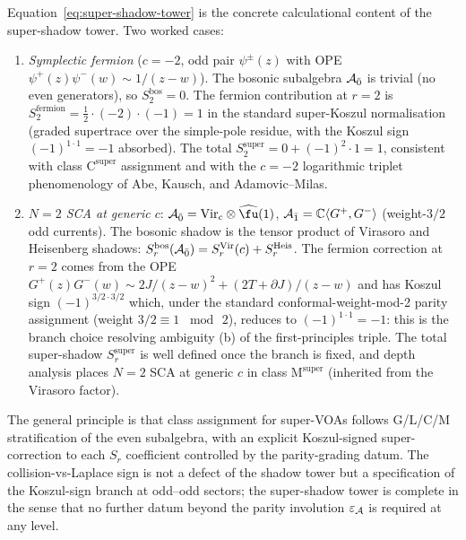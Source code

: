\begin{remark}[Super-shadow compatibility; symplectic fermion and
 $N=2$ SCA]
\label{rem:super-shadow-compatibility}
Equation~\eqref{eq:super-shadow-tower} is the concrete calculational
content of the super-shadow tower. Two worked cases:
\begin{enumerate}[label=\textup{(\alph*)}]
\item \emph{Symplectic fermion} ($c=-2$, odd pair
 $\psi^\pm(z)$ with OPE $\psi^+(z)\psi^-(w)\sim 1/(z-w)$). The
 bosonic subalgebra $\mathcal{A}_{\bar{0}}$ is trivial (no even
 generators), so $S_2^{\mathrm{bos}} = 0$. The fermion contribution
 at $r=2$ is
 $S_2^{\mathrm{fermion}} = \tfrac{1}{2}\cdot(-2)\cdot(-1)
 = 1$ in the standard super-Koszul normalisation (graded supertrace
 over the simple-pole residue, with the Koszul sign $(-1)^{1\cdot 1}=-1$
 absorbed). The total
 $S_2^{\mathrm{super}} = 0 + (-1)^2\cdot 1 = 1$, consistent with
 class $\mathrm{C}^{\mathrm{super}}$ assignment and with the
 $c=-2$ logarithmic triplet phenomenology of Abe, Kausch, and
 Adamovic--Milas.
\item \emph{$N=2$ SCA at generic $c$}: $\cA_{\bar{0}} =
 \mathrm{Vir}_c\otimes\widehat{\fu}(1)$, $\mathcal{A}_{\bar{1}} =
 \mathbb{C}\langle G^+, G^-\rangle$ (weight-$3/2$ odd currents).
 The bosonic shadow is the tensor product of Virasoro and
 Heisenberg shadows:
 $S_r^{\mathrm{bos}}(\mathcal{A}_{\bar{0}}) =
 S_r^{\mathrm{Vir}}(c) + S_r^{\mathrm{Heis}}$. The fermion
 correction at $r=2$ comes from the OPE
 $G^+(z)G^-(w) \sim 2J/(z-w)^2 + (2T+\partial J)/(z-w)$ and has
 Koszul sign $(-1)^{3/2\cdot 3/2}$ which, under the standard
 conformal-weight-mod-2 parity assignment (weight $3/2\equiv 1$
 $\bmod\,2$), reduces to $(-1)^{1\cdot 1}=-1$: this is the branch
 choice resolving ambiguity (b) of the first-principles
 triple. The total super-shadow $S_r^{\mathrm{super}}$ is well
 defined once the branch is fixed, and depth analysis places
 $N=2$ SCA at generic $c$ in class $\mathrm{M}^{\mathrm{super}}$
 (inherited from the Virasoro factor).
\end{enumerate}
The general principle is that class assignment for super-VOAs follows
G/L/C/M stratification of the even subalgebra, with an explicit
Koszul-signed super-correction to each $S_r$ coefficient controlled by
the parity-grading datum. The collision-vs-Laplace sign is not a
defect of the shadow tower
but a specification of the Koszul-sign branch at odd--odd sectors;
the super-shadow tower is complete in the sense that no further
datum beyond the parity involution $\varepsilon_{\mathcal{A}}$ is required at
any level.
\end{remark}

